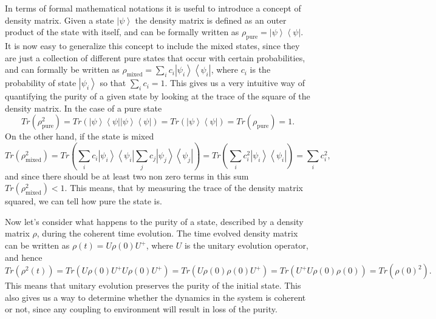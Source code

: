  In terms of formal mathematical notations it is useful to introduce a concept of density matrix. Given a state $\left|\psi \right>$ the density matrix is defined as an outer product of the state with itself, and can be formally written as $\rho_{\mathrm{pure}} = \left|\psi \right> \left< \psi \right|$. It is now easy to generalize this concept to include the mixed states, since they are just a collection of different pure states that occur  with certain probabilities, and can formally be written as $\rho_{\mathrm{mixed}} = \sum_{i} c_{i}\left|\psi_{i} \right> \left< \psi_{i} \right|$, where $c_{i}$ is the probability of state $\left|\psi_{i} \right>$ so that $\sum_{i}c_{i}=1$. This gives us a very intuitive way of quantifying the purity of a given state by looking at the trace of the square of the density matrix. In the case of a pure state 
 \begin{equation}
  Tr(\rho_{\mathrm{pure}}^2) = Tr(\left|\psi \right> \left< \psi \right| \left|\psi \right> \left< \psi \right|) = Tr(\left|\psi \right> \left< \psi \right|) = Tr(\rho_{\mathrm{pure}})=1.
 \end{equation}
 On the other hand, if the state is mixed
 \begin{equation}
 Tr(\rho_{\mathrm{mixed}}^2) = Tr(\sum_{i} c_{i}\left|\psi_{i} \right> \left< \psi_{i} \right| \sum_{j} c_{j}\left|\psi_{j} \right> \left< \psi_{j} \right|) = Tr(\sum_{i} c^2_{i}\left|\psi_{i} \right> \left< \psi_{i} \right|) = \sum_{i} c^2_{i},
 \end{equation}
and since there should be at least two non zero terms in this sum $Tr(\rho_{\mathrm{mixed}}^2) <1$. This means, that by measuring the trace of the density matrix squared, we can tell how pure the state is. 

Now let's consider what happens to the purity of a state, described by a density matrix $\rho$, during the coherent time evolution. The time evolved density matrix can be written as $\rho(t) = U\rho(0) U^+$, where $U$ is the unitary evolution operator, and hence 
\begin{equation}
Tr(\rho^2(t)) = Tr(U\rho(0) U^+ U\rho(0) U^+) = Tr(U\rho(0) \rho(0) U^+) = Tr(U^+ U\rho(0) \rho(0))  = Tr(\rho(0)^2). 
\end{equation}
This means that unitary evolution preserves the purity of the initial state. This also gives us a way to determine whether the dynamics in the system is coherent or not, since any coupling to environment will result in loss of the purity. 

